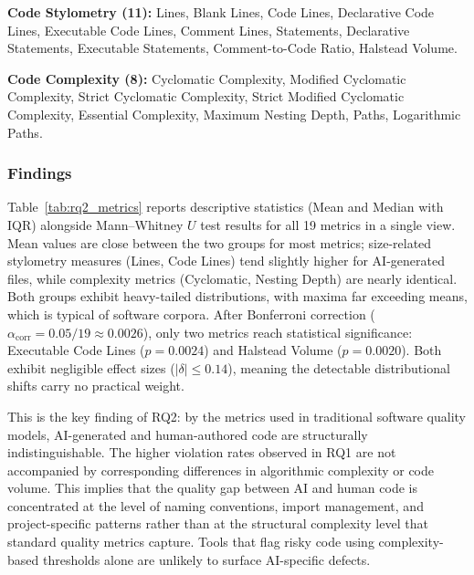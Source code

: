 \vspace{0.5em}
\textbf{Code Stylometry (11):} Lines, Blank Lines, Code Lines, Declarative Code Lines, Executable Code Lines, Comment Lines, Statements, Declarative Statements, Executable Statements, Comment-to-Code Ratio, Halstead Volume.

\vspace{0.5em}
\textbf{Code Complexity (8):} Cyclomatic Complexity, Modified Cyclomatic Complexity, Strict Cyclomatic Complexity, Strict Modified Cyclomatic Complexity, Essential Complexity, Maximum Nesting Depth, Paths, Logarithmic Paths.

\subsubsection{Findings}

Table~\ref{tab:rq2_metrics} reports descriptive statistics (Mean and Median with IQR) alongside Mann--Whitney $U$ test results for all 19 metrics in a single view. Mean values are close between the two groups for most metrics; size-related stylometry measures (Lines, Code Lines) tend slightly higher for AI-generated files, while complexity metrics (Cyclomatic, Nesting Depth) are nearly identical. Both groups exhibit heavy-tailed distributions, with maxima far exceeding means, which is typical of software corpora. After Bonferroni correction ($\alpha_{\mathrm{corr}} = 0.05/19 \approx 0.0026$), only two metrics reach statistical significance: Executable Code Lines ($p = 0.0024$) and Halstead Volume ($p = 0.0020$). Both exhibit negligible effect sizes ($|\delta| \leq 0.14$), meaning the detectable distributional shifts carry no practical weight.

This is the key finding of RQ2: by the metrics used in traditional software quality models, AI-generated and human-authored code are structurally indistinguishable. The higher violation rates observed in RQ1 are not accompanied by corresponding differences in algorithmic complexity or code volume. This implies that the quality gap between AI and human code is concentrated at the level of naming conventions, import management, and project-specific patterns rather than at the structural complexity level that standard quality metrics capture. Tools that flag risky code using complexity-based thresholds alone are unlikely to surface AI-specific defects.

